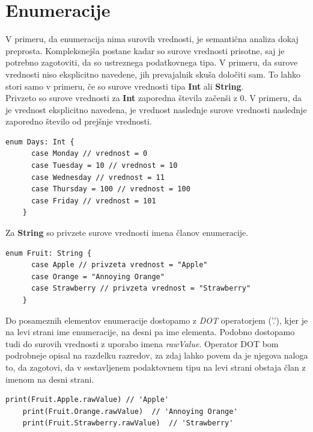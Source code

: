 \documentclass[a4paper, 12pt]{book}
\begin{document}
\section{Enumeracije}

V primeru, da enumeracija nima surovih vrednosti, je semantična analiza dokaj preprosta. Kompleksnejša postane kadar so surove vrednosti prisotne, saj je potrebno zagotoviti, da so ustreznega podatkovnega tipa. V primeru, da surove vrednosti niso eksplicitno navedene, jih prevajalnik skuša določiti sam. To lahko stori samo v primeru, če so surove vrednosti tipa \textbf{Int} ali \textbf{String}. \\
\indent Privzeto so surove vrednosti za \textbf{Int} zaporedna števila začenši z 0. V primeru, da je vrednost eksplicitno navedena, je vrednost naslednje surove vrednosti naslednje zaporedno število od prejšnje vrednosti.

\begin{lstlisting}[caption={Enumeracija s surovimi vrednostmi tipa Int}, captionpos=b]
	enum Days: Int {
	  case Monday // vrednost = 0
	  case Tuesday = 10 // vrednost = 10
	  case Wednesday // vrednost = 11
	  case Thursday = 100 // vrednost = 100
	  case Friday // vrednost = 101
	}
\end{lstlisting}

\indent Za \textbf{String} so privzete surove vrednosti imena članov enumeracije.

\begin{lstlisting}[caption={Enumeracija s surovimi vrednostmi tipa String}, captionpos=b, label={lst:fruitEnumeration}]
	enum Fruit: String {
	  case Apple // privzeta vrednost = "Apple"
	  case Orange = "Annoying Orange"
	  case Strawberry // privzeta vrednost = "Strawberry"
	}
\end{lstlisting}

Do posameznih elementov enumeracije dostopamo z \textit{DOT} operatorjem ('.'), kjer je na levi strani ime enumeracije, na desni pa ime elementa. Podobno dostopamo tudi do surovih vrednosti z uporabo imena \textit{rawValue}. Operator DOT bom podrobneje opisal na razdelku razredov, za zdaj lahko povem da je njegova naloga to, da zagotovi, da v sestavljenem podaktovnem tipu na levi strani obstaja član z imenom na desni strani.

\begin{lstlisting}[caption={Primer dostopa do elementov enumeracije ~\ref{lst:fruitEnumeration}}, captionpos=b]
	print(Fruit.Apple.rawValue) // 'Apple'
	print(Fruit.Orange.rawValue)  // 'Annoying Orange'
	print(Fruit.Strawberry.rawValue)  // 'Strawberry'
\end{lstlisting}
\end{document}
